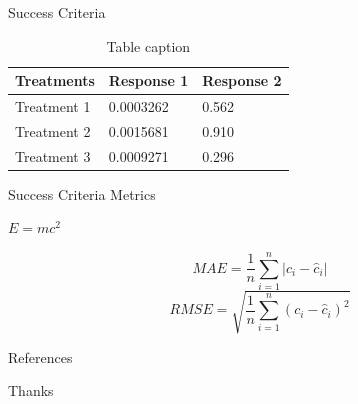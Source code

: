 \documentclass[aspectratio=169,xcolor=dvipsnames]{beamer}
\begin{document}
\begin{frame}{Success Criteria}
	\begin{table}
		\begin{tabular}{l l l}
			\toprule
			\textbf{Treatments} & \textbf{Response 1} & \textbf{Response 2} \\
			\midrule
			Treatment 1         & 0.0003262           & 0.562               \\
			Treatment 2         & 0.0015681           & 0.910               \\
			Treatment 3         & 0.0009271           & 0.296               \\
			\bottomrule
		\end{tabular}
		\caption{Table caption}
	\end{table}
\end{frame}


\begin{frame}{Success Criteria Metrics}
	\begin{theorem}
		$E = mc^2$
	\end{theorem}
	\begin{equation}
		MAE=\frac{1}{n}\sum_{i=1}^{n}|c_i- \hat{c}_i|
	\end{equation} 
	\begin{equation}
		RMSE=\sqrt{\frac{1}{n}\sum_{i=1}^{n}(c_i - \hat{c}_i)^2}
	\end{equation}
\end{frame}


\begin{frame}[allowframebreaks]{References}
    \printbibliography
\end{frame}


\begin{frame}
    \Huge{\centerline{Thanks}}
\end{frame}


	
\end{document}
